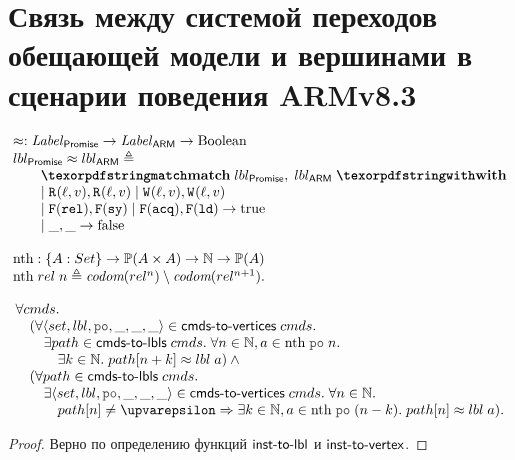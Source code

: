 \chapter{Связь между системой переходов обещающей модели и вершинами в сценарии поведения ARMv8.3}
\label{sec:lts-rel}

\[\inarr{
  \approx : \Label_{\Promise} \rightarrow \Label_{\ARM} \rightarrow {\rm Boolean} \\
  lbl_{\Promise} \approx lbl_{\ARM} \defeq \\
  \qquad \kw{match} \; lbl_{\Promise}, \; lbl_{\ARM} \; \kw{with} \\
  \qquad
    \begin{array}{@{}l}
      \mid \rlab{}{\loc}{\val}, \rlab{}{\loc}{\val}
      \mid \wlab{}{\loc}{\val}, \wlab{}{\loc}{\val} \\
      \mid \flab{\rel}, \flab{\SY}
      \mid \flab{\acq}, \flab{\LD} \rightarrow {\rm true} \\
      \mid \_, \_ \rightarrow {\rm false}
    \end{array} \\
  \\
  \nthf : \{A : Set\} \rightarrow \Pset(A \times A) \rightarrow \mathbb{N} \rightarrow \Pset(A) \\
  \nthf \; rel \; n \defeq \codom{rel^{n}} \setminus \codom{rel^{n + 1}}.
}\]

\begin{theorem}
\[\inarr{
\forall \Carm. \\
\quad (\forall \tup{set, lbl, \lPO, \_, \_, \_} \in \cmdsToVrtxs \; \Carm. \\
\qquad \exists path \in \cmdsToLbls \; \Carm. \; \forall n \in \mathbb{N}, a \in \nthf \; \lPO \; n. \\
\qquad \quad \exists k \in \mathbb{N}. \; path[n + k] \approx lbl \; a) \land {} \\
\quad (\forall path \in \cmdsToLbls \; \Carm. \\
\qquad \exists \tup{set, lbl, \lPO, \_, \_, \_} \in \cmdsToVrtxs \; \Carm. \;
  \forall n \in \mathbb{N}. \\
\qquad \quad path[n] \neq \epsilon \Rightarrow \exists k \in \mathbb{N}, a \in \nthf \; \lPO \; (n - k). \; path[n] \approx lbl \; a).
}\]
\end{theorem}
\begin{proof}
  Верно по определению функций $\textup{\sf inst-to-lbl}$ и $\textup{\sf inst-to-vertex}$.
\end{proof}
